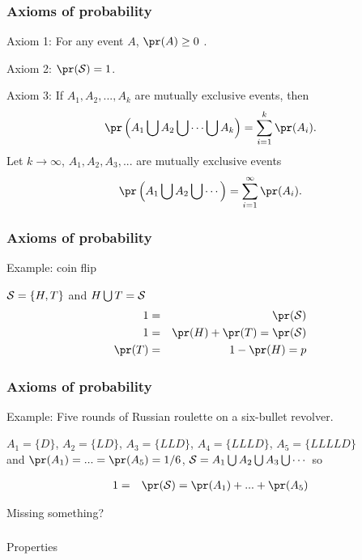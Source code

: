 \begin{frame}[fragile]\frametitle{Axioms of probability}

\begin{defn}

Axiom 1: For any event $A$, $\pr(A) \geq 0$ . 

Axiom 2: $\pr({\cal S}) =1$. 

Axiom 3: If $A_1,A_2,...,A_k$ are mutually exclusive events, then
$$\pr\left(A_1 \bigcup A_2 \bigcup \cdots \bigcup A_k\right) = \sum_{i=1}^k
\pr(A_i).$$ 
Let $k \rightarrow \infty$,  $A_1,A_2,A_3,...$ are mutually exclusive events
$$\pr\left(A_1 \bigcup A_2 \bigcup \cdots\right) = \sum_{i=1}^\infty \pr(A_i).$$

\end{defn}

\end{frame}


\begin{frame}[fragile]\frametitle{Axioms of probability}

Example: coin flip

${\cal S} = \{H,T\}$ and $H \bigcup T = {\cal S}$ 
\begin{eqnarray*}
1 & =& \pr({\cal S})\\ 
1 & = & \pr(H) + \pr(T) = \pr({\cal S}) \\ 
\pr(T) &= & 1 - \pr(H) = p 
\end{eqnarray*}

\end{frame}


\begin{frame}[fragile]\frametitle{Axioms of probability}

Example: Five rounds of Russian roulette on a six-bullet revolver.

$A_1 = \{D\}$, $A_2 = \{LD\}$, $A_3 = \{LLD\}$, $A_4 = \{LLLD\}$, $A_{5} = \{LLLLD\}$ \\ 
and $\pr(A_1)=...=\pr(A_{5}) = 1/6$, ${\cal S} = A_1 \bigcup A_2 \bigcup A_3 \bigcup \cdots$
so

\begin{eqnarray*}
1 & = & \pr({\cal S}) = \pr(A_1) + ... + \pr(A_5) 
\end{eqnarray*}

Missing something?

\end{frame}

\begin{frame}[fragile]\frametitle{}
\begin{center}
{\Large Properties}

\end{center}
\end{frame}




